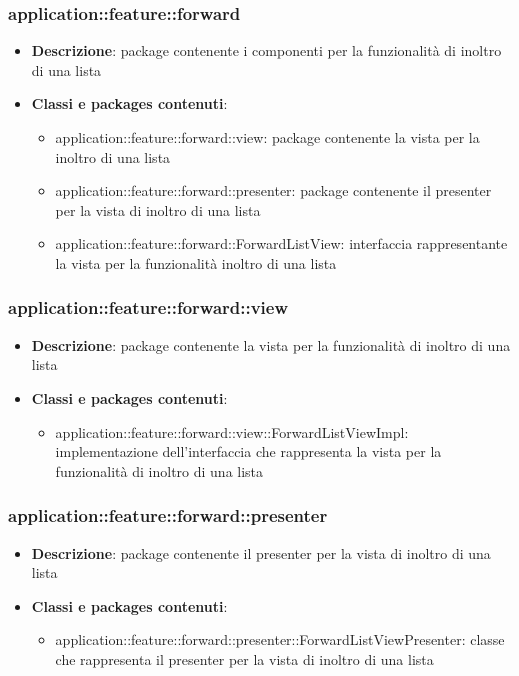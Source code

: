 \subsubsection{application::feature::forward}
\begin{itemize}
	\item \textbf{Descrizione}: package contenente i componenti per la funzionalità di inoltro di una lista
	\item \textbf{Classi e packages contenuti}:
	\begin{itemize}
	\item application::feature::forward::view: package contenente la vista per la inoltro di una lista
	\item application::feature::forward::presenter: package contenente il presenter per la vista di inoltro di una lista
	\item application::feature::forward::ForwardListView: interfaccia rappresentante la vista per la funzionalità inoltro di una lista
	\end{itemize}
\end{itemize}

\subsubsection{application::feature::forward::view}
\begin{itemize}
	\item \textbf{Descrizione}: package contenente la vista per la funzionalità di inoltro di una lista
	\item \textbf{Classi e packages contenuti}:
	\begin{itemize}
	\item application::feature::forward::view::ForwardListViewImpl: implementazione dell'interfaccia che rappresenta la vista per la funzionalità di inoltro di una lista
	\end{itemize}
\end{itemize}

\subsubsection{application::feature::forward::presenter}
\begin{itemize}
	\item \textbf{Descrizione}: package contenente il presenter per la vista di inoltro di una lista
	\item \textbf{Classi e packages contenuti}:
	\begin{itemize}
	\item application::feature::forward::presenter::ForwardListViewPresenter: classe che rappresenta il presenter per la vista di inoltro di una lista
	\end{itemize}
\end{itemize}

